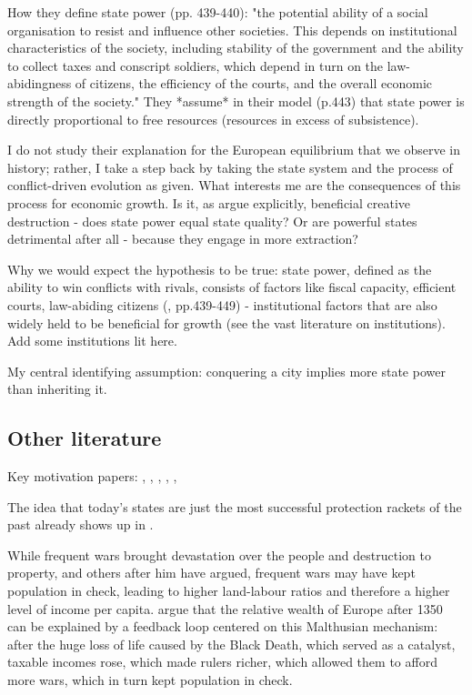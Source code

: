 \documentclass{article}
\begin{document}
How they define state power (pp. 439-440): "the potential ability of a social organisation to resist and influence other societies. This depends on institutional characteristics of the society, including stability of the government and the ability to collect taxes and conscript soldiers, which depend in turn on the law-abidingness of citizens, the efficiency of the courts, and the overall economic strength of the society." They *assume* in their model (p.443) that state power is directly proportional to free resources (resources in excess of subsistence).


I do not study their explanation for the European equilibrium that we observe in history; rather, I take a step back by taking the state system and the process of conflict-driven evolution as given. What interests me are the consequences of this process for economic growth.
Is it, as \cite{schoenholzer2022} argue explicitly, beneficial creative destruction - does state power equal state quality? Or are powerful states detrimental after all - because they engage in more extraction? \cite{tilly1985}


Why we would expect the hypothesis to be true: state power, defined as the ability to win conflicts with rivals, consists of factors like fiscal capacity, efficient courts, law-abiding citizens (\citealp{levine2021}, pp.439-449) - institutional factors that are also widely held to be beneficial for growth (see the vast literature on institutions). Add some institutions lit here.


My central identifying assumption: conquering a city implies more state power than inheriting it.




\subsection*{Other literature}

Key motivation papers: \cite{levine2013, levine2021}, \cite{diamond1997}, \cite{schoenholzer2022}, \cite{cervellati2022}, \cite{voigtlnder2013}, \cite{tilly1985}

The idea that today's states are just the most successful protection rackets of the past already shows up in \cite{tilly1985}.

While frequent wars brought devastation over the people and destruction to property, \cite{malthus1798} and others after him have argued, frequent wars may have kept population in check, leading to higher land-labour ratios and therefore a higher level of income per capita. \cite{voigtlnder2013} argue that the relative wealth of Europe after 1350 can be explained by a feedback loop centered on this Malthusian mechanism: after the huge loss of life caused by the Black Death, which served as a catalyst, taxable incomes rose, which made rulers richer, which allowed them to afford more wars, which in turn kept population in check.
\end{document}
